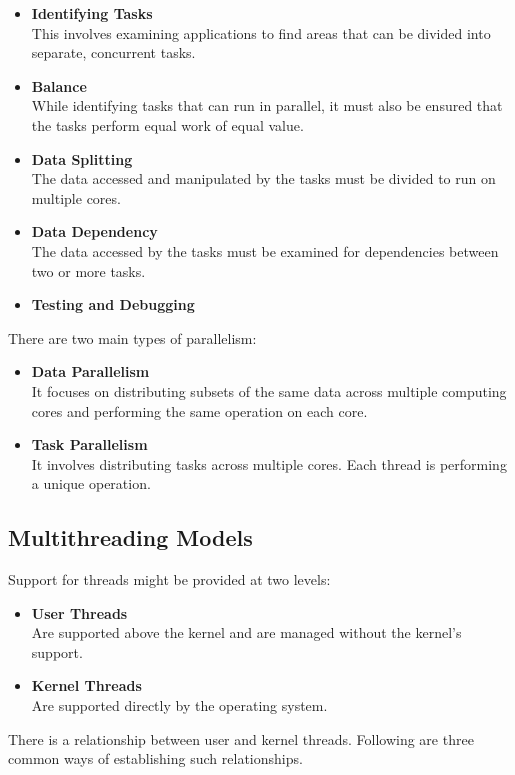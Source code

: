 \documentclass{article}
\begin{document}
\begin{itemize}
	\item \textbf{Identifying Tasks}
	\vspace{.2cm} \\
	This involves examining applications to find areas that can be divided into separate, concurrent tasks.
	
	\item \textbf{Balance}
	\vspace{.2cm} \\
	While identifying tasks that can run in parallel, it must also be ensured that the tasks perform equal work of equal value.
	
	\item \textbf{Data Splitting}
	\vspace{.2cm} \\
	The data accessed and manipulated by the tasks must be divided to run on multiple cores.
	
	\item \textbf{Data Dependency}
	\vspace{.2cm} \\
	The data accessed by the tasks must be examined for dependencies between two or more tasks.
	
	\item \textbf{Testing and Debugging}
\end{itemize}
There are two main types of parallelism:

\begin{itemize}
	\item \textbf{Data Parallelism}
	\vspace{.2cm} \\
	It focuses on distributing subsets of the same data across multiple computing cores and performing the same operation on each core.
	
	\item \textbf{Task Parallelism}
	\vspace{.2cm} \\
	It involves distributing tasks across multiple cores. Each thread is performing a unique operation.
\end{itemize}

\subsection{Multithreading Models}
Support for threads might be provided at two levels:

\begin{itemize}
	\item \textbf{User Threads}
	\vspace{.2cm} \\
	Are supported above the kernel and are managed without the kernel's support.
	
	\item \textbf{Kernel Threads}
	\vspace{.2cm} \\
	Are supported directly by the operating system.
\end{itemize}
There is a relationship between user and kernel threads. Following are three common ways of establishing such relationships.
\end{document}
